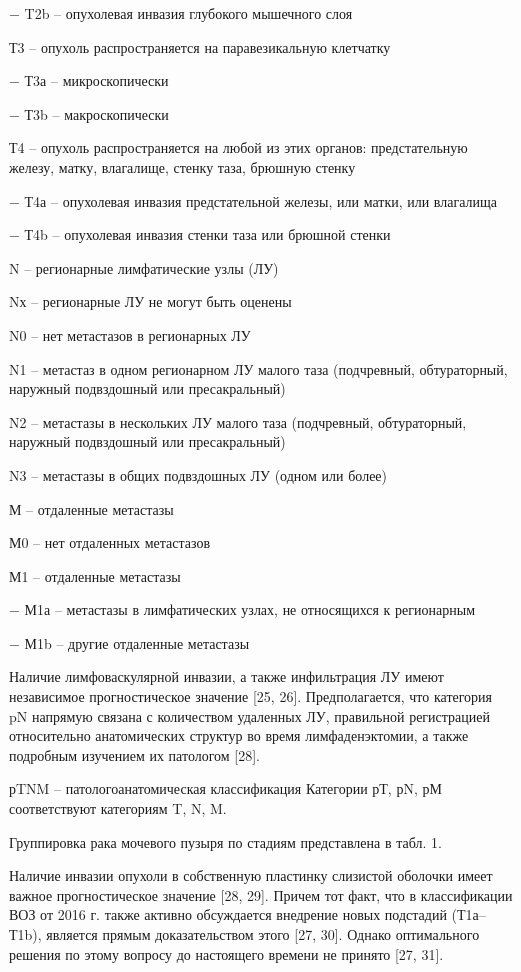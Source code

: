 − T2b – опухолевая инвазия глубокого мышечного слоя

Т3 – опухоль распространяется на паравезикальную клетчатку

− Т3а – микроскопически

− Т3b – макроскопически

Т4 – опухоль распространяется на любой из этих органов: предстательную железу, матку, влагалище, стенку таза, брюшную стенку

− Т4а – опухолевая инвазия предстательной железы, или матки, или влагалища

− Т4b – опухолевая инвазия стенки таза или брюшной стенки

N – регионарные лимфатические узлы (ЛУ)

Nх – регионарные ЛУ не могут быть оценены

N0 – нет метастазов в регионарных ЛУ

N1 – метастаз в одном регионарном ЛУ малого таза (подчревный, обтураторный, наружный подвздошный или пресакральный)

N2 – метастазы в нескольких ЛУ малого таза (подчревный, обтураторный, наружный подвздошный или пресакральный)

N3 – метастазы в общих подвздошных ЛУ (одном или более)

М – отдаленные метастазы

М0 – нет отдаленных метастазов

М1 – отдаленные метастазы

− М1а – метастазы в лимфатических узлах, не относящихся к регионарным

− М1b – другие отдаленные метастазы

Наличие лимфоваскулярной инвазии, а также инфильтрация ЛУ имеют независимое прогностическое значение [25, 26]. Предполагается, что категория pN напрямую связана с количеством удаленных ЛУ, правильной регистрацией относительно анатомических структур во время лимфаденэктомии, а также подробным изучением их патологом [28].

рTNM – патологоанатомическая классификация Категории рТ, рN, рМ соответствуют категориям T, N, M.

Группировка рака мочевого пузыря по стадиям представлена в табл. 1.



Наличие инвазии опухоли в собственную пластинку слизистой оболочки имеет важное прогностическое значение [28, 29]. Причем тот факт, что в классификации ВОЗ от 2016 г. также активно обсуждается внедрение новых подстадий (Т1а–Т1b), является прямым доказательством этого [27, 30]. Однако оптимального решения по этому вопросу до настоящего времени не принято [27, 31].

